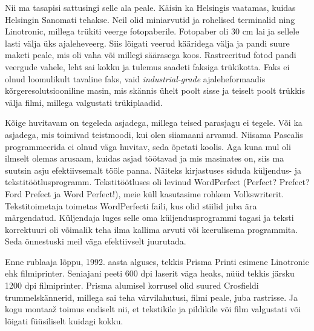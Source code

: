Nii ma tasapisi sattusingi selle ala peale. Käisin ka Helsingis vaatamas, 
kuidas Helsingin Sanomati tehakse. Neil olid 
miniarvutid ja rohelised terminalid ning 
Linotronic, millega trükiti veerge 
fotopaberile. Fotopaber oli 30 cm lai ja sellele lasti välja üks 
ajaleheveerg. Siis lõigati veerud kääridega välja ja pandi suure 
maketi peale, mis oli vaha või millegi säärasega koos. Rastreeritud fotod 
pandi veergude vahele, leht sai kokku ja tulemus saadeti faksiga 
trükikotta. Faks ei olnud loomulikult tavaline faks, vaid 
\emph{industrial-grade} ajaleheformaadis kõrgeresolutsiooniline masin, mis 
skännis ühelt poolt sisse ja teiselt poolt trükkis välja 
filmi, millega valgustati trükiplaadid. 


Kõige huvitavam on tegeleda asjadega, millega teised parasjagu ei tegele. Või 
ka asjadega, mis toimivad teistmoodi, kui olen 
siiamaani arvanud. Niisama Pascalis programmeerida ei olnud väga huvitav, seda õpetati 
koolis. Aga kuna mul oli ilmselt olemas arusaam, kuidas asjad töötavad 
ja mis masinates on, siis ma suutsin asju efektiivsemalt tööle panna. Näiteks kirjastuses siduda küljendus- ja 
tekstitöötlusprogramm. Tekstitöötluses oli levinud WordPerfect (Perfect? 
Prefect? Ford Prefect ja Word Perfect!), meie küll kasutasime rohkem Volkswriterit. Tekstitoimetaja toimetas 
WordPerfecti faili, kus olid stiilid juba ära märgendatud. Küljendaja luges
selle oma küljendusprogrammi tagasi ja teksti korrektuuri oli võimalik teha ilma kallima arvuti või 
keerulisema programmita. Seda õnnestuski meil väga efektiivselt juurutada. 

Enne rublaaja lõppu, 1992. aasta alguses, tekkis Prisma 
Printi esimene Linotronic ehk filmiprinter. Seniajani
peeti 600 dpi laserit väga heaks, nüüd tekkis järsku 1200 dpi 
filmiprinter. Prisma alumisel korrusel olid suured Crosfieldi trummelskännerid, millega sai 
teha värvilahutusi, filmi peale, juba rastrisse. Ja kogu montaaž 
toimus endiselt nii, et tekstikile ja pildikile või film 
valgustati või lõigati füüsiliselt kuidagi kokku. 

